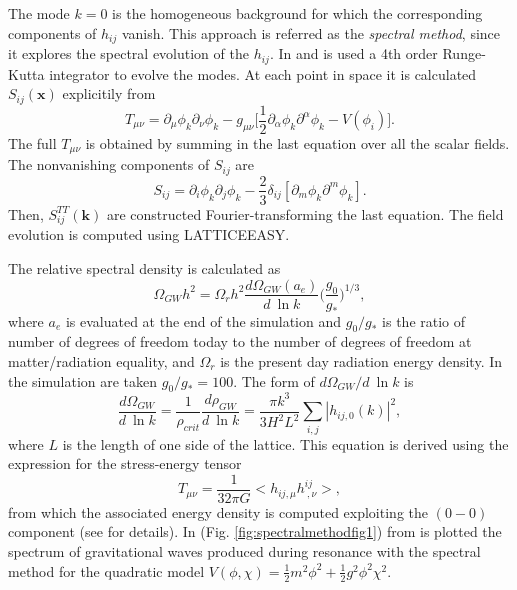 \documentclass[11pt,a4paper,twoside]{book}
\begin{document}
The mode $ k=0 $ is the homogeneous background for which the corresponding components of $ h_{ij} $ vanish. This approach is referred as the \textit{spectral method}, since it explores the spectral evolution of the $ h_{ij} $. In \cite{Chap7:SpectralMethod} and \cite{Chap7:SpectralMethodComparison} is used a 4th order Runge-Kutta integrator to evolve the modes. At each point in space it is calculated $ S_{ij}(\textbf{x}) $ explicitily from
\begin{equation}
\label{Chap7:SpectralMethod_StressEnergyTensor}
T_{\mu\nu}=\partial_{\mu}\phi_{k}\partial_{\nu}\phi_{k} - g_{\mu\nu}\Bigg[\frac{1}{2}\partial_{\alpha}\phi_{k}\partial^{\alpha}\phi_{k} - V(\phi_{i})\Bigg].
\end{equation}
The full $ T_{\mu\nu} $ is obtained by summing in the last equation over all the scalar fields. The nonvanishing components of $ S_{ij} $ are 
\begin{equation}
\label{Chap7:SijNonVanishingComponent}
S_{ij}=\partial_{i}\phi_{k}\partial_{j}\phi_{k} - \frac{2}{3}\delta_{ij}[\partial_{m}\phi_{k}\partial^{m}\phi_{k}].
\end{equation}
Then, $ S^{TT}_{ij}(\textbf{k}) $ are constructed Fourier-transforming the last equation. The field evolution is computed using LATTICEEASY.

The relative spectral density is calculated as
\begin{equation}
\label{Chap7:spectralDensity}
\Omega_{GW}h^{2} = \Omega_{r}h^{2}\frac{d\Omega_{GW}(a_{e})}{d\ \ln k}\Bigg(\frac{g_{0}}{g_{*}}\Bigg)^{1/3},
\end{equation} 
where $ a_{e} $ is evaluated at the end of the simulation and $ g_{0}/g_{*} $ is the ratio of number of degrees of freedom today to the number of degrees of freedom at matter/radiation equality, and $ \Omega_{r} $ is the present day radiation energy density. In the simulation are taken $ g_{0}/g_{*}=100 $. The form of $d\Omega_{GW}/d\ \ln k  $ is 
\begin{equation}
\label{Chap7:SpectralDensity}
\frac{d \Omega_{GW}}{d\ \ln k}=\frac{1}{\rho_{crit}}\frac{d\rho_{GW}}{d\ \ln k}=\frac{\pi k^{3}}{3H^{2}L^{2}}\sum_{i,j}|h_{ij,0}(k)|^{2},
\end{equation}
where $ L $ is the length of one side of the lattice. This equation is derived using the expression for the stress-energy tensor
\begin{equation}
\label{Chap7:StressEnergyTensorSpectralMethod}
T_{\mu\nu}=\frac{1}{32\pi G}<h_{ij,\mu}h^{ij}_{\ ,\nu}>,
\end{equation}
from which the associated energy density is computed exploiting the $ (0-0) $ component (see \cite{Chap7:SpectralMethodComparison} for details). In (Fig. \ref{fig:spectralmethodfig1}) from \cite{Chap7:SpectralMethod} is plotted the spectrum of gravitational waves produced during resonance with the spectral method for the quadratic  model $ V(\phi,\chi)=\frac{1}{2}m^{2}\phi^{2} + \frac{1}{2}g^{2}\phi^{2}\chi^{2} $.
\end{document}
